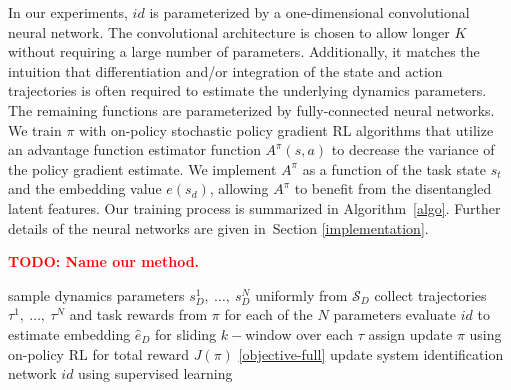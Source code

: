\documentclass{article}
\newcommand{\E}{\mathbb{E}}
\newcommand{\TODO}[1]{\textcolor{red}{\textbf{TODO: #1}}}
\newcommand{\cA}{\mathcal{A}}
\newcommand{\cH}{\mathcal{H}}
\newcommand{\cL}{\mathcal{L}}
\newcommand{\cS}{\mathcal{S}}
\newcommand{\embedfn}{e}
\newcommand{\idfn}{id}
\newcommand{\latent}{\cL}
\newcommand{\secref}[1]{Section \ref{#1}}
\begin{document}
In our experiments, $\idfn$ is parameterized by a one-dimensional convolutional neural network.
The convolutional architecture is chosen to allow longer $K$ without requiring a large number of parameters.
Additionally, it matches the intuition that differentiation and/or integration of the state and action trajectories
is often required to estimate the underlying dynamics parameters.
The remaining functions are parameterized by fully-connected neural networks.
We train $\pi$ with on-policy stochastic policy gradient RL algorithms
that utilize an advantage function estimator function $A^\pi (s, a)$ to decrease the variance of the policy gradient estimate.
We implement $A^\pi$ as a function of the task state $s_t$ and the embedding value $\embedfn(s_d)$,
allowing $A^\pi$ to benefit from the disentangled latent features.
Our training process is summarized in Algorithm~\ref{algo}.
Further details of the neural networks are given in~\secref{implementation}.


\begin{algorithm}[h]
\caption{\TODO{Name our method.}}
\begin{algorithmic}
  \State sample dynamics parameters $s_D^1,\ \dots,\ s_D^N$ uniformly from $\cS_D$
  \State collect trajectories $\tau^1,\ \dots,\ \tau^N$ and task rewards from $\pi$ for each of the $N$ parameters
  \State evaluate $\idfn$ to estimate embedding $\hat e_D$ for sliding $k-$window over each $\tau$
  \State assign 
  \State update $\pi$ using on-policy RL for total reward $J(\pi)$ \eqref{objective-full}
  \State update system identification network $\idfn$ using supervised learning
\EndFor
\end{algorithmic}
\label{algo}
\end{algorithm}

\end{document}
